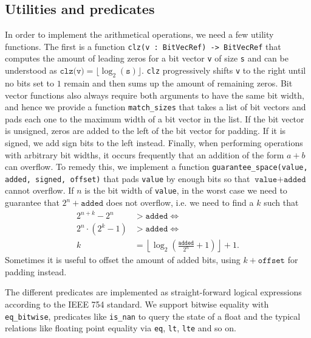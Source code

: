 \documentclass[a4paper,UKenglish,cleveref, autoref, thm-restate]{lipics-v2019}
\begin{document}
\subsection{Utilities and predicates}
In order to implement the arithmetical operations, we need a few utility functions. The first is a function \verb|clz(v : BitVecRef) -> BitVecRef| that computes the amount of leading zeros for a bit vector \verb|v| of size \verb|s| and can be understood as $\texttt{clz(v)} = \lfloor \log_2(\texttt{s}) \rfloor$. \verb|clz| progressively shifts \verb|v| to the right until no bits set to $1$ remain and then sums up the amount of remaining zeros. 
Bit vector functions also always require both arguments to have the same bit width, and hence we provide a function \verb|match_sizes| that takes a list of bit vectors and pads each one to the maximum width of a bit vector in the list. If the bit vector is unsigned, zeros are added to the left of the bit vector for padding. If it is signed, we add sign bits to the left instead.
Finally, when performing operations with arbitrary bit widths, it occurs frequently that an addition of the form $a + b$ can overflow. To remedy this, we implement a function \verb|guarantee_space(value, added, signed, offset)| that pads \verb|value| by enough bits so that $\texttt{value} + \texttt{added}$ cannot overflow. If $n$ is the bit width of \verb|value|, in the worst case we need to guarantee that $2^n + \texttt{added}$ does not overflow, i.e. we need to find a $k$ such that
\begin{align*}
2^{n + k} - 2^n &> \texttt{added} \iff \\
2^n \cdot (2^k - 1) &> \texttt{added} \iff \\
k &= \left\lfloor \log_2\left(\frac{\texttt{added}}{2^n} + 1\right) \right\rfloor + 1.
\end{align*}
Sometimes it is useful to offset the amount of added bits, using $k + \texttt{offset}$ for padding instead.

The different predicates are implemented as straight-forward logical expressions according to the IEEE 754 standard. We support bitwise equality with \verb|eq_bitwise|, predicates like \verb|is_nan| to query the state of a float and the typical relations like floating point equality via \verb|eq|, \verb|lt|, \verb|lte| and so on.
\end{document}
